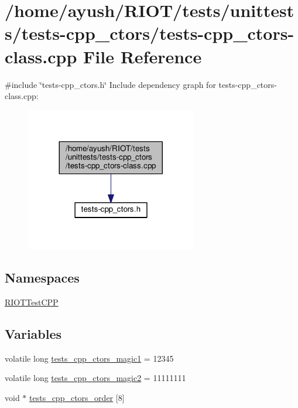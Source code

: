 \hypertarget{tests-cpp__ctors-class_8cpp}{}\section{/home/ayush/\+R\+I\+O\+T/tests/unittests/tests-\/cpp\+\_\+ctors/tests-\/cpp\+\_\+ctors-\/class.cpp File Reference}
\label{tests-cpp__ctors-class_8cpp}
{\ttfamily \#include \char`\"{}tests-\/cpp\+\_\+ctors.\+h\char`\"{}}\newline
Include dependency graph for tests-\/cpp\+\_\+ctors-\/class.cpp\+:
\nopagebreak
\begin{figure}[H]
\begin{center}
\leavevmode
\includegraphics[width=212pt]{tests-cpp__ctors-class_8cpp__incl}
\end{center}
\end{figure}
\subsection*{Namespaces}
\begin{DoxyCompactItemize}
\item 
 \hyperlink{namespaceRIOTTestCPP}{R\+I\+O\+T\+Test\+C\+PP}
\end{DoxyCompactItemize}
\subsection*{Variables}
\begin{DoxyCompactItemize}
\item 
volatile long \hyperlink{tests-cpp__ctors-class_8cpp_a5619bbc2d07e49c6a1b1a3fe75bb3977}{tests\+\_\+cpp\+\_\+ctors\+\_\+magic1} = 12345
\item 
volatile long \hyperlink{tests-cpp__ctors-class_8cpp_a5d0a3a17669d50bc13f993a880e309f5}{tests\+\_\+cpp\+\_\+ctors\+\_\+magic2} = 11111111
\item 
void $\ast$ \hyperlink{tests-cpp__ctors-class_8cpp_a97fee776631a57a7cbe25a6508dc17dd}{tests\+\_\+cpp\+\_\+ctors\+\_\+order} \mbox{[}8\mbox{]}
\end{DoxyCompactItemize}


